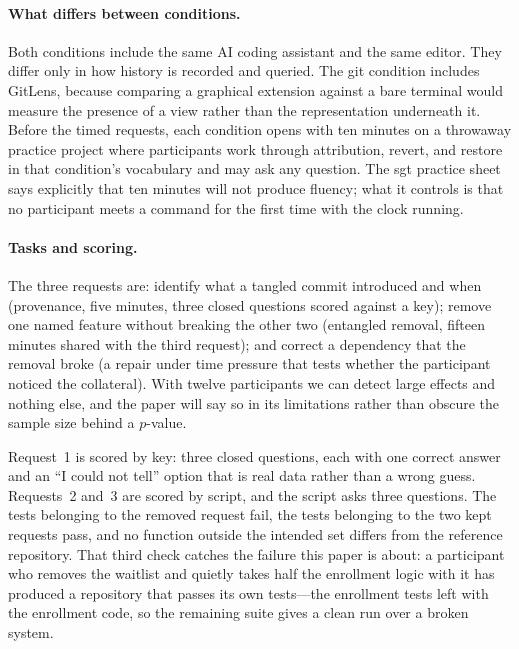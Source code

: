 \paragraph{What differs between conditions.}
Both conditions include the same AI coding assistant and the same editor. They
differ only in how history is recorded and queried. The git condition includes
GitLens, because comparing a graphical extension against a bare terminal would
measure the presence of a view rather than the representation underneath it.
Before the timed requests, each condition opens with ten minutes on a throwaway
practice project where participants work through attribution, revert, and restore
in that condition's vocabulary and may ask any question. The sgt practice sheet
says explicitly that ten minutes will not produce fluency; what it controls is that
no participant meets a command for the first time with the clock running.

\paragraph{Tasks and scoring.}
The three requests are: identify what a tangled commit introduced and when
(provenance, five minutes, three closed questions scored against a key); remove
one named feature without breaking the other two (entangled removal, fifteen
minutes shared with the third request); and correct a dependency that the removal
broke (a repair under time pressure that tests whether the participant noticed the
collateral). With twelve participants we can detect large effects and nothing
else, and the paper will say so in its limitations rather than obscure the sample
size behind a $p$-value.

Request~1 is scored by key: three closed questions, each with one correct answer
and an ``I could not tell'' option that is real data rather than a wrong guess.
Requests~2 and~3 are scored by script, and the script asks three questions. The
tests belonging to the removed request fail, the tests belonging to the two kept
requests pass, and no function outside the intended set differs from the reference
repository. That third check catches the failure this paper is about: a participant who removes
the waitlist and quietly takes half the enrollment logic with it has produced a
repository that passes its own tests---the enrollment tests left with the
enrollment code, so the remaining suite gives a clean run over a broken system.


